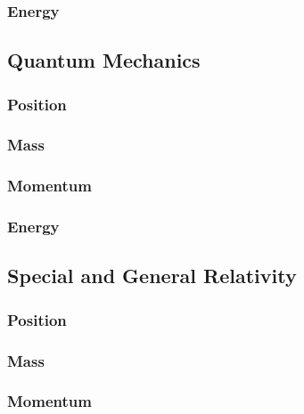 \documentclass{article}
\begin{document}
\newpage

\subsubsection{Energy}

\newpage 



\subsection{Quantum Mechanics}

\subsubsection{Position}

\newpage

\subsubsection{Mass}

\newpage

\subsubsection{Momentum}

\newpage

\subsubsection{Energy}

\newpage 



\subsection{Special and General Relativity}

\subsubsection{Position}

\newpage

\subsubsection{Mass}

\newpage

\subsubsection{Momentum}
\end{document}
